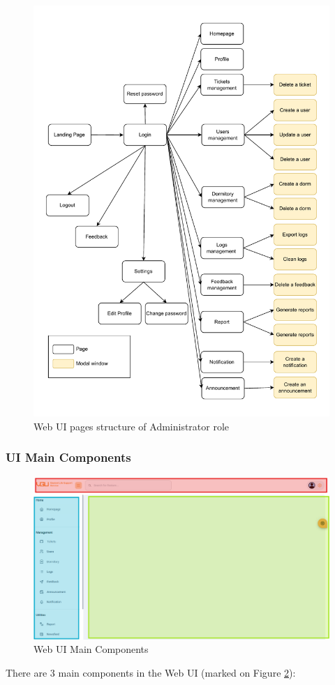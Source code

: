 	
	
	\begin{figure}[H]
		\centering
		\includegraphics[width=0.85\linewidth]{graphics/fe/ui-pages-admin.pdf}
		\caption{Web UI pages structure of Administrator role}
		\label{fig:fe-ui-page-admin}
	\end{figure}
	

	\subsubsection{UI Main Components}
	\begin{figure}[H]
		\centering
		\includegraphics[width=1\linewidth]{graphics/fe/fe-main-comp}
		\caption{Web UI Main Components}
		\label{fig:fe-main-comp}
	\end{figure}
	There are 3 main components in the Web UI (marked on Figure \ref{fig:fe-main-comp}):
	
